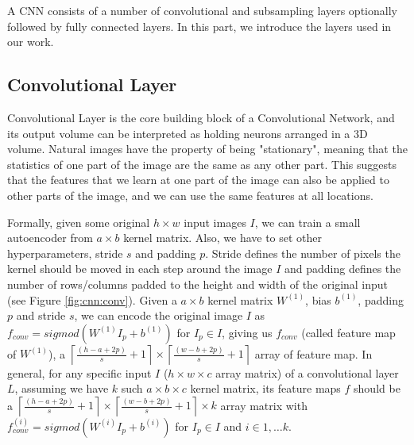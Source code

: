 A CNN consists of a number of convolutional and subsampling layers optionally followed by fully connected layers. In this part, we introduce the layers used in our work.
\subsection{Convolutional Layer}
Convolutional Layer is the core building block of a Convolutional Network, and its output volume can be interpreted as holding neurons arranged in a 3D volume.
Natural images have the property of being "stationary", meaning that the statistics of one part of the image are the same as any other part. This suggests that the features that we learn at one part of the image can also be applied to other parts of the image, and we can use the same features at all locations.

Formally, given some original $h\times w$ input images $I$, we can train a small autoencoder from $a \times b$ kernel matrix. Also, we have to set other hyperparameters, stride $s$ and padding $p$. Stride defines the number of pixels the kernel should be moved in each step around the image $I$ and padding defines the number of rows/columns padded to the height and width of the original input (see Figure \ref{fig:cnn:conv}). 
Given a $a \times b$ kernel matrix $W^{(1)}$, bias $b^{(1)}$, padding $p$ and stride $s$, we can encode the original image $I$ as $f_{conv}=sigmod(W^{(1)}I_p+b^{(1)})$ for $I_p \in I$, giving us $f_{conv}$ (called feature map of $W^{(1)}$), a  $\left\lceil\frac{(h-a+2p)}{s}+1\right\rceil\times\left\lceil\frac{(w-b+2p)}{s}+1\right\rceil$ array of feature map. In general, for any specific input $I$ ($h \times w \times c$ array matrix) of a convolutional layer $L$, assuming we have $k$ such $a \times b \times c$ kernel matrix, its feature maps $f$ should be a $\left\lceil\frac{(h-a+2p)}{s}+1\right\rceil\times\left\lceil\frac{(w-b+2p)}{s}+1\right\rceil \times k$ array matrix with $f_{conv}^{(i)}=sigmod(W^{(i)}I_p+b^{(i)})$ for $I_p \in I$ and $i \in 1,\dots k$.

